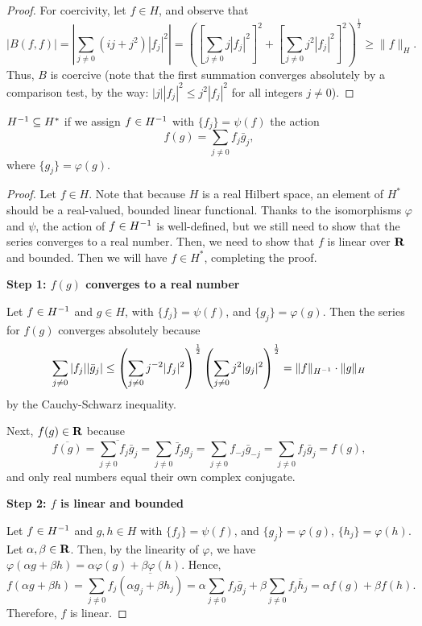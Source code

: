 \documentclass{homework}
\begin{document}
\begin{arabicparts}
\begin{proof}
			For coercivity, let $f \in H$, and observe that
			\begin{equation}
				|B(f,f)| = \left|\sum_{j\ne0}(ij+j^2)|f_j|^2\right| = \left(\left[\sum_{j\ne0}j|f_j|^2\right]^2 + \left[\sum_{j\ne0}j^2|f_j|^2\right]^2\right)^\frac{1}{2} \ge \lVert f\rVert_H.
			\end{equation}
			Thus, $B$ is coercive (note that the first summation converges absolutely by a comparison test, by the way: $|j||f_j|^2 \le j^2|f_j|^2$ for all integers $j \ne 0$).
		\end{proof}
		
		\questionpart
		${H^{-1}} \subseteq H^*$ if we assign $f \in {H^{-1}}$ with $\{f_j\} = \psi(f)$ the action
		\begin{equation}
			f(g) = \sum_{j\ne0}f_j\bar{g}_j,
		\end{equation}
		where $\{g_j\}=\varphi(g)$.
		
		\begin{proof}
			Let $f\in H$. Note that because $H$ is a real Hilbert space, an element of $H^*$ should be a real-valued, bounded linear functional. Thanks to the isomorphisms $\varphi$ and $\psi$, the action of $f \in {H^{-1}}$ is well-defined, but we still need to show that the series converges to a real number. Then, we need to show that $f$ is linear over $\textbf{R}$ and bounded. Then we will have $f \in H^*$, completing the proof.
			
			\textbf{Step 1: $f(g)$ converges to a real number}
			
			Let $f \in {H^{-1}}$ and $g\in H$, with $\{f_j\} = \psi(f)$, and $\{g_j\} = \varphi(g)$. Then the series for $f(g)$ converges absolutely because
			\begin{equation}
				\label{eq:f_bounded}
				\sum_{j\ne0}|f_j||\bar{g}_j| \le \left(\sum_{j\ne0}j^{-2}|f_j|^2\right)^\frac{1}{2}\left(\sum_{j\ne0}j^2|g_j|^2\right)^\frac{1}{2} = \lVert f\rVert_{H^{-1}}\cdot\lVert g\rVert_H
			\end{equation}
			by the Cauchy-Schwarz inequality.
			
			Next, $f(g) \in \textbf{R}$ because
			\begin{equation}
				\overline{f(g)}=\overline{\sum_{j\ne0}f_j\bar{g}_j} = \sum_{j\ne0}\bar{f}_jg_j = \sum_{j\ne0}f_{-j}\bar{g}_{-j} = \sum_{j\ne0}f_j\bar{g}_j = f(g),
			\end{equation}
			and only real numbers equal their own complex conjugate.
			
			\textbf{Step 2: $f$ is linear and bounded}
			
			Let $f \in {H^{-1}}$ and $g,h \in H$ with $\{f_j\} = \psi(f)$, and $\{g_j\} = \varphi(g)$, $\{h_j\} = \varphi(h)$. Let $\alpha,\beta\in\textbf{R}$. Then, by the linearity of $\varphi$, we have $\varphi(\alpha g + \beta h) = \alpha\varphi(g) + \beta\varphi(h)$. Hence,
			\begin{equation}
				f(\alpha g + \beta h) = \sum_{j\ne0} f_j\overline{(\alpha g_j + \beta h_j)} = \alpha\sum_{j\ne0}f_j\bar{g}_j + \beta\sum_{j\ne0}f_j\bar{h}_j = \alpha f(g) + \beta f(h).
			\end{equation}
			Therefore, $f$ is linear.
			

\end{proof}
\end{arabicparts}
\end{document}
